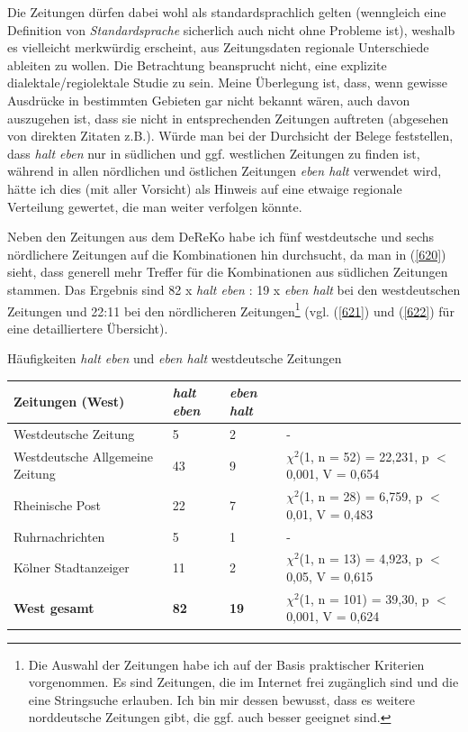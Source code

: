 Die Zeitungen dürfen dabei wohl als standardsprachlich gelten (wenngleich eine Definition von \textit{Standardsprache}  sicherlich auch nicht ohne Probleme ist), wes\-halb es vielleicht merkwürdig erscheint, aus Zeitungsdaten regionale Unterschiede ableiten zu wollen. Die Betrachtung beansprucht nicht, eine explizite dialektale/regiolektale Studie zu sein. Meine Überlegung ist, dass, wenn gewisse Ausdrücke in bestimmten Gebieten gar nicht bekannt wären,  auch davon auszugehen ist, dass sie nicht in entsprechenden Zeitungen auftreten (abgesehen von direkten Zitaten z.B.). Würde man bei der Durchsicht der Belege feststellen, dass \textit{halt eben} nur in südlichen und ggf. westlichen Zeitungen zu finden ist, während in allen nördlichen und östlichen Zeitungen \textit{eben halt} verwendet wird, hätte ich dies (mit aller Vorsicht) als Hinweis auf eine etwaige regionale Verteilung ge\-wertet, die man weiter verfolgen könnte.

Neben den Zeitungen aus dem DeReKo habe ich fünf westdeutsche und sechs nördlichere Zeitungen auf die Kombinationen hin durchsucht, da man in (\ref{620}) sieht, dass generell mehr Treffer für die Kombinationen aus südlichen Zeitungen stammen. Das Ergebnis sind 82 x \textit{halt eben} : 19 x \textit{eben halt} bei den westdeutschen Zeitungen und 22:11 bei den nördlicheren Zeitungen\footnote{Die Auswahl der Zeitungen habe ich auf der Basis praktischer Kriterien vorgenommen. Es sind Zeitungen, die im Internet frei zugänglich sind und die eine Stringsuche erlauben. Ich bin mir dessen bewusst, dass es weitere norddeutsche Zeitungen gibt, die ggf. auch besser geeignet sind.} (vgl. (\ref{621}) und (\ref{622}) für eine detailliertere Übersicht). 

\begin{exe}
	\ex\label{621}Häufigkeiten \textit{halt eben} und \textit{eben halt} westdeutsche Zeitungen\\[-0.6em]
	\scriptsize
     \begin{tabular}[t]{|l|l|l|l|}
     \hline
	 \textbf{Zeitungen (West)} & \textit{halt eben} & \textit{eben halt} & {} \\
	 \hline
	 Westdeutsche Zeitung & 5 & 2 & -\\
	 \hline
	 Westdeutsche Allgemeine Zeitung & 43 & 9 & $\chi^2$(1, n = 52) = 22,231, p $<$ 0,001, V = 0,654\\
	 \hline
	 Rheinische Post & 22 & 7 & $\chi^2$(1, n = 28) = 6,759, p $<$ 0,01, V = 0,483\\
	 \hline
	 Ruhrnachrichten & 5 & 1 & -\\
	 \hline
	 Kölner Stadtanzeiger & 11 & 2 & $\chi^2$(1, n = 13) = 4,923, p $<$ 0,05, V = 0,615\\
	 \hline
	 \textbf{West gesamt} & \textbf{82} & \textbf{19} & $\chi^2$(1, n = 101) = 39,30, p $<$ 0,001, V = 0,624\\
	 \hline 
     \end{tabular}
\end{exe}

